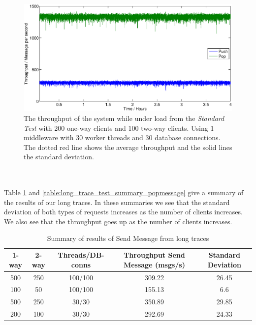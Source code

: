 \documentclass{article}
\begin{document}
            \begin{figure}[H]
                \hspace{-4.5cm}
                \includegraphics[scale=0.750]{4h_throughput}
                \caption{The throughput of the system while under load from the \textit{Standard Test} with 200 one-way clients and 100 two-way clients. Using 1 middleware with 30 worker threads and 30 database connections. The dotted red line shows the average throughput and the solid lines the standard deviation.}
                \label{fig:4h_throughput}
            \end{figure}
            ~\\
            ~\\
            Table \ref{table:long_trace_test_summary_sendmessage} and \ref{table:long_trace_test_summary_popmessage} give a summary of the results of our long traces. In these summaries we see that the standard deviation of both types of requests increases as the number of clients increases. We also see that the throughput goes up as the number of clients increases.

            \begin{table}[H]
                \label{table:long_trace_test_summary_sendmessage}
                \caption{Summary of results of Send Message from long traces}
                \begin{adjustwidth}{-2cm}{}
                    \begin{tabular}{|c|c|c|c|c|}
                        \hline 
                        \textbf{1-way} & \textbf{2-way} & \textbf{Threads/DB-conns} & \textbf{Throughput Send Message (msgs/s)} & \textbf{Standard Deviation}\\ 
                        \hline 
                        500 & 250 & 100/100 &309.22 &26.45\\
                        \hline
                        100 & 50 & 100/100 &155.13 &6.6\\
                        \hline 
                        500 & 250 & 30/30 &350.89 &29.85\\
                        \hline
                        200 & 100 & 30/30 &292.69 &24.33\\
                        \hline
                    \end{tabular} 
                \end{adjustwidth}
            \end{table}
\end{document}

